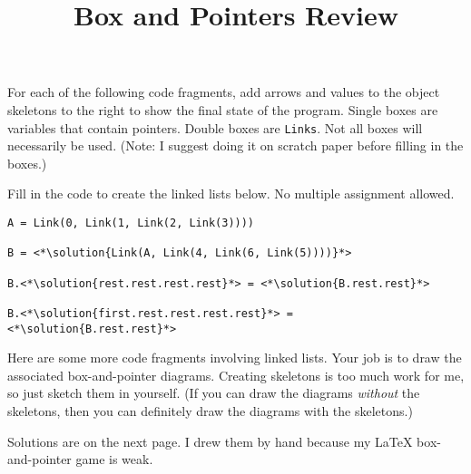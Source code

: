 \documentclass[twoside]{article}
\title{\sc Box and Pointers Review \solution{(Solutions)}}
\newcommand{\solution}[1]{{\color{red}#1}}
\newcommand{\solutionimage}[2]{#2} %
\newcommand\solution[1]{} %
\newcommand{\solutionimage}[2]{#1} %
\begin{document}
\thispagestyle{empty}
\maketitle

\begin{enumerate}

For each of the following code fragments, add arrows and values to the object skeletons to the right to show the final state of the program.  Single boxes are variables that contain pointers.  Double boxes are \lstinline/Links/. Not all boxes will necessarily be used. (Note: I suggest doing it on scratch paper before filling in the boxes.)

\vspace{0.2in}

\solutionimage{}{}

\vspace{0.2in}

Fill in the code to create the linked lists below. No multiple assignment allowed.

\vspace{0.2in}



\vspace{0.2in}

\begin{lstlisting}
A = Link(0, Link(1, Link(2, Link(3))))

B = <*\solution{Link(A, Link(4, Link(6, Link(5))))}*>

B.<*\solution{rest.rest.rest.rest}*> = <*\solution{B.rest.rest}*>

B.<*\solution{first.rest.rest.rest.rest}*> = <*\solution{B.rest.rest}*>
\end{lstlisting}


Here are some more code fragments involving linked lists. Your job is to draw the associated box-and-pointer diagrams. Creating skeletons is too much work for me, so just sketch them in yourself. (If you can draw the diagrams \textit{without} the skeletons, then you can definitely draw the diagrams with the skeletons.)

\solution{Solutions are on the next page.\newline
I drew them by hand because my LaTeX box-and-pointer game is weak.}


\end{enumerate}
\end{document}
